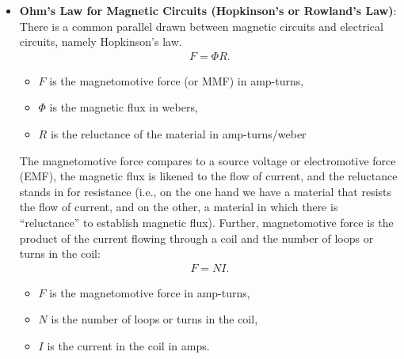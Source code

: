 \documentclass{report}
\begin{document}
\begin{itemize}
            Recall that one tesla is defined as one weber per square meter. An alternate unit that is sometimes used is \textbf{gauss}.
            \begin{align*}
                1 \text{ tesla } = 10^{3} \text{ gauss }
            .\end{align*}
            Consider an example. Suppose a magnetic flux of $6\times 10^{-5}$ webers exists in a core whose cross section has dimensions of 1 centimeter by 2 centimeters. Determine the flux density in teslas.
            \begin{align*}
                B = \frac{\Phi}{A} = \frac{6\times 10^{-5}}{0.01m \times 0.02m} = 0.3 T
            .\end{align*}
        \item \textbf{Ohm's Law for Magnetic Circuits (Hopkinson's or Rowland's Law)}: There is a common parallel drawn between magnetic circuits and electrical circuits, namely Hopkinson's law.
            \begin{align*}
                F = \Phi R
            .\end{align*}
            \begin{itemize}
                \item $F$ is the magnetomotive force (or MMF) in amp-turns,
                \item $\Phi$ is the magnetic flux in webers,
                \item $R$ is the reluctance of the material in amp-turns/weber
            \end{itemize}
            The magnetomotive force compares to a source voltage or electromotive force (EMF), the magnetic flux is likened to the flow of current, and the reluctance stands in for resistance (i.e., on the one hand we have a material that resists the flow of current, and on the other, a material in which there is “reluctance” to establish magnetic flux). Further, magnetomotive force is the product of the current flowing through a coil and the number of loops or turns in the coil:
            \begin{align*}
                F = NI
            .\end{align*}
            \begin{itemize}
                \item $F$ is the magnetomotive force in amp-turns,
                \item $N$ is the number of loops or turns in the coil,
                \item $I$ is the current in the coil in amps.

\end{itemize}
\end{itemize}
\end{document}
